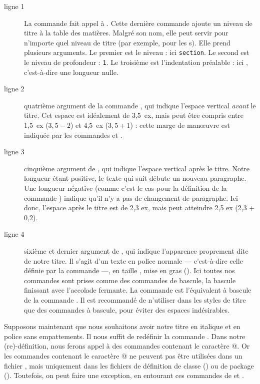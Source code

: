 \begin{description}
\item[ligne 1]La commande  fait appel à . Cette dernière commande ajoute  un niveau de titre à la table des matières. Malgré son nom, elle peut servir pour n'importe quel niveau de titre (par exemple, pour les s). Elle prend plusieurs arguments. Le premier est le niveau : ici \verb|section|. Le second est le niveau de profondeur : \verb|1|. Le troisième est l'indentation préalable : ici , c'est-à-dire une longueur nulle.

\item[ligne 2] quatrième argument de la commande , qui indique l'espace vertical \emph{avant} le titre. Cet espace est idéalement de 3,5~ex, mais peut être compris entre 1,5~ex ($3,5 - 2$) et 4,5~ex ($3,5 + 1$) :  cette marge de manœuvre est indiquée par les commandes   et .
\item[ligne 3] cinquième argument de , qui indique l'espace vertical après le titre. Notre longueur étant positive, le texte qui suit débute un nouveau paragraphe. Une longueur négative (comme c'est le cas pour la définition de la commande ) indique qu'il n'y a pas de changement de paragraphe. Ici donc, l'espace après le titre est de 2,3 ex, mais peut atteindre 2,5 ex (2,3 + 0,2).
\item[ligne 4] sixième et dernier argument de , qui indique l'apparence proprement dite de notre titre. Il s'agit d'un texte en police normale --- c'est-à-dire celle définie par la commande  ---, en taille , mise en gras (). Ici toutes nos commandes sont prises comme des commandes de bascule, la bascule finissant avec l'accolade fermante. La commande  est l'équivalent à bascule de la commande . Il est recommandé de n'utiliser dans les styles de titre que des commandes à bascule, pour éviter des espaces indésirables.\label{bfseries}
\end{description}

Supposons maintenant que nous souhaitons avoir notre titre en italique et en police sans empattements.  Il nous suffit de redéfinir la commande .
Dans notre (re)-définition, nous  ferons appel à des commandes contenant le caractère @. Or les commandes contenant le caractère @ ne peuvent pas être  utilisées dans un fichier , mais uniquement dans les fichiers de définition de classe () ou de package (). Toutefois, on peut faire une exception,  en  entourant ces commandes  de  et .

